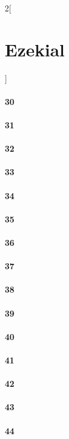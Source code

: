 \documentclass{book}
\begin{document}
\begin{multicols}{2}[\part{Ezekial}]
\subsection*{30}
\subsection*{31}
\subsection*{32}
\subsection*{33}
\subsection*{34}
\subsection*{35}
\subsection*{36}
\subsection*{37}
\subsection*{38}
\subsection*{39}
\subsection*{40}
\subsection*{41}
\subsection*{42}
\subsection*{43}
\subsection*{44}

\end{multicols}
\end{document}
